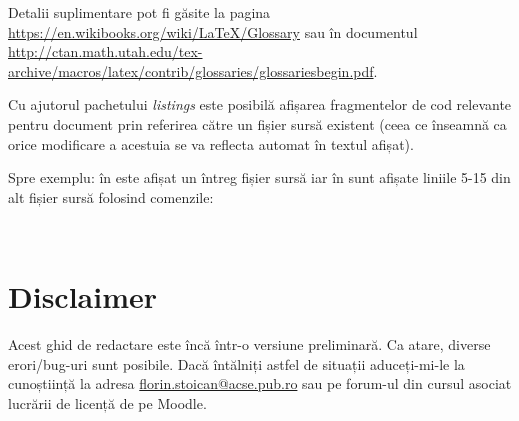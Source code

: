 \begin{description}[style=nextline]
Detalii suplimentare pot fi găsite la pagina \url{https://en.wikibooks.org/wiki/LaTeX/Glossary} sau în documentul \url{http://ctan.math.utah.edu/tex-archive/macros/latex/contrib/glossaries/glossariesbegin.pdf}.

\item[fragmente de cod] 
Cu ajutorul pachetului \emph{listings} este posibilă afișarea fragmentelor de cod relevante pentru document prin referirea către un fișier sursă existent (ceea ce înseamnă ca orice modificare a acestuia se va reflecta automat în textul afișat).

Spre exemplu:  în  este afișat un întreg fișier sursă iar în  sunt afișate liniile 5-15 din alt fișier sursă folosind comenzile:

\begin{Verbatim}[samepage=true]


\end{Verbatim}

\end{description}


\section*{Disclaimer}

Acest ghid de redactare este încă într-o versiune preliminară. Ca atare, diverse erori/bug-uri sunt posibile. Dacă întălniți astfel de situații aduceți-mi-le la cunoștiință la adresa \href{mailto:florin.stoican@acse.pub.ro}{florin.stoican@acse.pub.ro} sau pe forum-ul din cursul asociat lucrării de licență de pe Moodle.